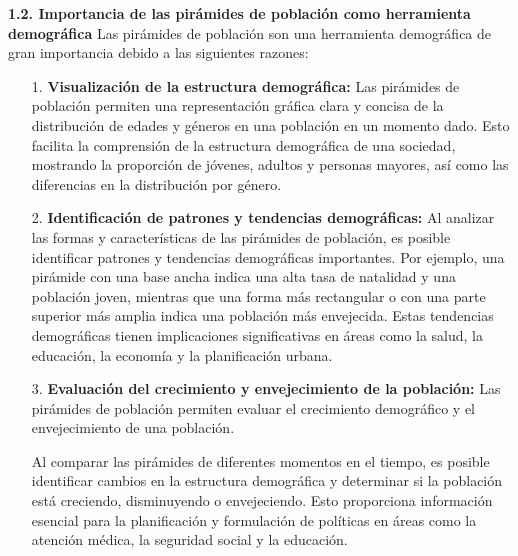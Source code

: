 \documentclass[8pt,a4paper]{beamer}
\begin{document}
{\begin{frame}{}
\end{frame}

\begin{frame}{}
\begin{block}{\textbf{1.2. Importancia de las pirámides de población como herramienta demográfica}}
Las pirámides de población son una herramienta demográfica de gran importancia debido a las siguientes razones:
\begin{enumerate}
\justifying
\item[1.] \textbf{Visualización de la estructura demográfica:} Las pirámides de población permiten una representación gráfica clara y concisa de la distribución de edades y géneros en una población en un momento dado. Esto facilita la comprensión de la estructura demográfica de una sociedad, mostrando la proporción de jóvenes, adultos y personas mayores, así como las diferencias en la distribución por género.

\item[2.] \textbf{Identificación de patrones y tendencias demográficas:} Al analizar las formas y características de las pirámides de población, es posible identificar patrones y tendencias demográficas importantes. Por ejemplo, una pirámide con una base ancha indica una alta tasa de natalidad y una población joven, mientras que una forma más rectangular o con una parte superior más amplia indica una población más envejecida. Estas tendencias demográficas tienen implicaciones significativas en áreas como la salud, la educación, la economía y la planificación urbana.

\item[3.] \textbf{Evaluación del crecimiento y envejecimiento de la población:} Las pirámides de población permiten evaluar el crecimiento demográfico y el envejecimiento de una población. 
\end{enumerate}
\end{block}
\end{frame}

\begin{frame}{}
\begin{block}{}
\begin{enumerate}
\justifying
\item[{}] Al comparar las pirámides de diferentes momentos en el tiempo, es posible identificar cambios en la estructura demográfica y determinar si la población está creciendo, disminuyendo o envejeciendo. Esto proporciona información esencial para la planificación y formulación de políticas en áreas como la atención médica, la seguridad social y la educación.


\end{enumerate}
\end{block}
\end{frame}}
\end{document}
